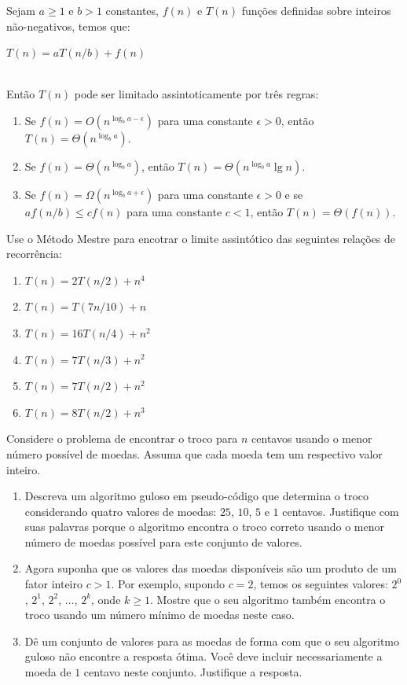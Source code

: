 \documentclass[12pt,a4paper]{article}
\begin{document}
\begin{question}[points=3.0,topics={Divisão-e-conquista}]
	Sejam $a \geq 1$ e $b > 1$ constantes, $f(n)$ e $T(n)$ funções definidas
	sobre inteiros não-negativos, temos que:
	\begin{table}[h!]
		\centering
		$T(n) = aT(n/b) + f(n)$
	\end{table}
	\\
	Então $T(n)$ pode ser limitado assintoticamente por três regras:
	\begin{enumerate}
		\item Se $f(n) = O(n^{\log_b{a-\epsilon}})$ para uma constante $\epsilon > 0$, então $T(n)=\Theta(n^{\log_b{a}})$.
		\item Se $f(n) = \Theta(n^{\log_b{a}})$, então $T(n)=\Theta(n^{\log_b{a}}\lg n)$.
		\item Se $f(n) = \Omega(n^{\log_b{a} + \epsilon})$ para uma constante $\epsilon > 0$ e se $af(n/b) \leq cf(n)$ para uma constante $c<1$, então $T(n) = \Theta(f(n))$.
	\end{enumerate}
	Use o Método Mestre para encotrar o limite assintótico das seguintes relações de recorrência:
	\begin{multicols}{2}
		\begin{enumerate}[label=(\alph*)]
		\item $T(n)=2T(n/2)+n^4$
		\item $T(n)=T(7n/10)+n$
		\item $T(n)=16T(n/4)+n^2$
		\item $T(n)=7T(n/3)+n^2$
		\item $T(n)=7T(n/2)+n^2$
		\item $T(n)=8T(n/2)+n^3$
		\end{enumerate}
	\end{multicols}
\end{question}

\begin{question}[points=2.5, topics={Algoritmos Gulosos}]
	Considere o problema de encontrar o troco para $n$ centavos usando o menor
	número possível de moedas. Assuma que cada moeda tem um respectivo valor inteiro.
	\begin{enumerate}[label=(\alph*)]
		\item Descreva um algoritmo guloso em pseudo-código que determina o
		troco considerando quatro valores de moedas: $25$, $10$, $5$ e $1$ centavos.
		Justifique com suas palavras porque o algoritmo encontra o troco correto
		usando o menor número de moedas possível para este conjunto de valores.
		\item Agora suponha que os valores das moedas disponíveis são um produto
		de um fator	inteiro $c>1$. Por exemplo, supondo $c=2$, temos os seguintes
		valores: $2^0$, $2^1$, $2^2$, $\ldots$, $2^k$, onde
		$k\geq1$. Mostre que o seu algoritmo também encontra o troco usando um
		número mínimo de moedas neste caso.
		\item Dê um conjunto de valores para as moedas de forma com que o seu 
		algoritmo guloso não encontre a resposta ótima. Você deve incluir necessariamente
		a moeda de $1$ centavo neste conjunto. Justifique a resposta.
	\end{enumerate}
\end{question}
\end{document}
